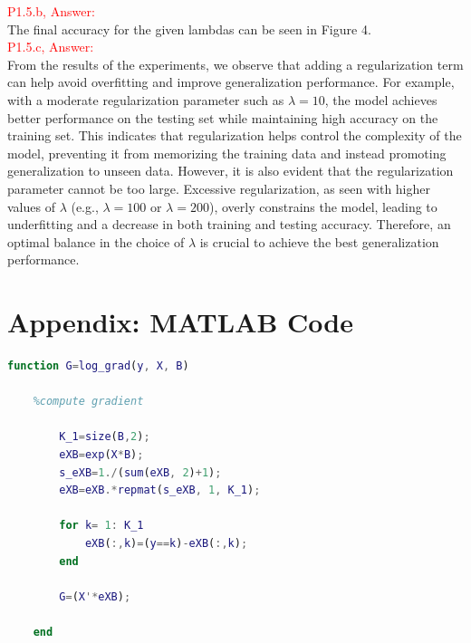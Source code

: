 \documentclass[11pt]{article}
\begin{document}
\textcolor{red}{P1.5.b, Answer:}\\

The final accuracy for the given lambdas can be seen in Figure 4.\\

\textcolor{red}{P1.5.c, Answer:}\\

From the results of the experiments, we observe that adding a regularization term can help avoid overfitting and improve 
generalization performance. For example, with a moderate regularization parameter such as \( \lambda = 10 \), 
the model achieves better performance on the testing set while maintaining high accuracy on the training set. 
This indicates that regularization helps control the complexity of the model, preventing it from memorizing the training 
data and instead promoting generalization to unseen data. However, it is also evident that the regularization parameter cannot 
be too large. Excessive regularization, as seen with higher values of \( \lambda \) (e.g., \( \lambda = 100 \) or \( \lambda = 200 \)), 
overly constrains the model, leading to underfitting and a decrease in both training and testing accuracy. 
Therefore, an optimal balance in the choice of \( \lambda \) is crucial to achieve the best generalization performance.

\clearpage

\appendix

\section{Appendix: MATLAB Code}

\begin{lstlisting}[language = matlab]
	function G=log_grad(y, X, B) 

	%compute gradient 
	
		K_1=size(B,2);
		eXB=exp(X*B);
		s_eXB=1./(sum(eXB, 2)+1);
		eXB=eXB.*repmat(s_eXB, 1, K_1);
		
		for k= 1: K_1
			eXB(:,k)=(y==k)-eXB(:,k);
		end
		
		G=(X'*eXB);
	
	end
\end{lstlisting}
\end{document}
